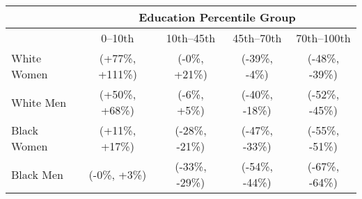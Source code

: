 \begin{tabular}{lcccc}
  \hline
              & \multicolumn{4}{p}{Education Percentile Group} \\
  \hline
              & 0--10th    & 10th--45th & 45th--70th & 70th--100th \\
  \hline
  White Women & (+77\%, +111\%) & (-0\%, +21\%) & (-39\%, -4\%) & (-48\%, -39\%)  \\
  White Men   & (+50\%, +68\%) & (-6\%, +5\%) & (-40\%, -18\%) & (-52\%, -45\%)  \\
  Black Women & (+11\%, +17\%) & (-28\%, -21\%) & (-47\%, -33\%) & (-55\%, -51\%)  \\
  Black Men   & (-0\%, +3\%) & (-33\%, -29\%) & (-54\%, -44\%) & (-67\%, -64\%)  \\
  
  \hline
\end{tabular}
